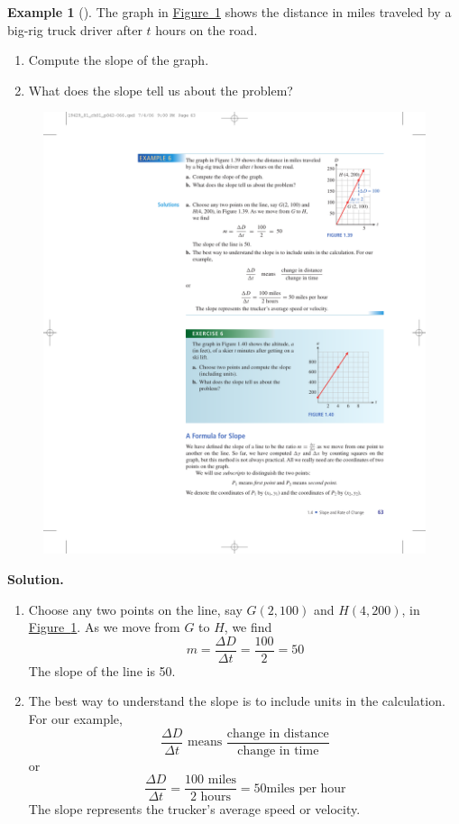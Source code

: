\documentclass[10pt,]{book}
\theoremstyle{plain}
\theoremstyle{definition}
\theoremstyle{definition}
\newtheorem{example}[theorem]{Example}
\theoremstyle{definition}
\theoremstyle{definition}
\numberwithin{equation}{part}
\begin{document}
\begin{example}[]\label{example-truck-speed}
The graph in \hyperref[fig-truck-speed]{Figure~\ref{fig-truck-speed}} shows the distance in miles traveled by a big-rig truck driver after \(t\) hours on the road. \leavevmode%
\begin{enumerate}[label=*\alph**]
\item\hypertarget{li-887}{}Compute the slope of the graph.%
\item\hypertarget{li-888}{}What does the slope tell us about the problem?%
\end{enumerate}
%
\begin{figure}
\centering
\includegraphics[width=0.4\linewidth]{images/fig-truck-speed}
\caption{\label{fig-truck-speed}}
\end{figure}
\par\medskip\noindent%
\textbf{Solution.}\quad \leavevmode%
\begin{enumerate}[label=*\alph**]
\item\hypertarget{li-889}{}Choose any two points on the line, say \(G(2, 100)\) and \(H(4, 200)\), in \hyperref[fig-truck-speed]{Figure~\ref{fig-truck-speed}}. As we move from \(G\) to \(H\), we find%
\begin{equation*}
m = \frac{\Delta D}{\Delta t}=\frac{100}{2}=50
\end{equation*}
The slope of the line is 50.%
\item\hypertarget{li-890}{}The best way to understand the slope is to include units in the calculation. For our example,%
\begin{equation*}
\frac{\Delta D}{\Delta t} \text{ means } \frac{\text{change in distance}}{\text{change in time}}
\end{equation*}
or%
\begin{equation*}
\frac{\Delta D}{\Delta t}
=\frac{100 \text{ miles}}{2\text{ hours}}
=50 \text{miles per hour}
\end{equation*}
The slope represents the trucker’s average speed or velocity.%
\end{enumerate}
%
\end{example}
\end{document}
